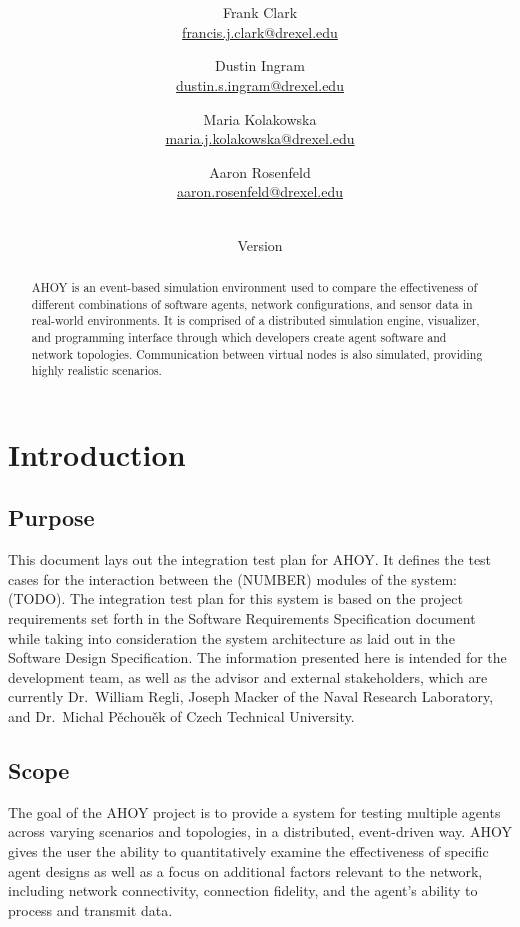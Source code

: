 \documentclass[titlepage]{article}
\title{\textbf{\mytitle}}
\author{
	Frank Clark \\\url{francis.j.clark@drexel.edu}
    \and Dustin Ingram \\\url{dustin.s.ingram@drexel.edu}
	\and Maria Kolakowska \\\url{maria.j.kolakowska@drexel.edu}
    \and Aaron Rosenfeld \\\url{aaron.rosenfeld@drexel.edu}
}
\date{\mydate\\Version \myversion}
\begin{document}

\begin{figure*}
    \centering
    \scalebox{0.8}{}
    \vspace{-4em}
\end{figure*}

\maketitle

\begin{abstract}
AHOY is an event-based simulation environment used to compare the effectiveness of different combinations of software agents, network configurations, and sensor data in real-world environments.  It is comprised of a distributed simulation engine, visualizer, and programming interface through which developers create agent software and network topologies.  Communication between virtual nodes is also simulated, providing highly realistic scenarios.
\end{abstract}

\setcounter{tocdepth}{4}
\tableofcontents
\label{toc}
\pagebreak
{}

\section{Introduction}
\label{sec:introduction}
\subsection{Purpose}
\label{sec:purpose}
This document lays out the integration test plan for AHOY. It defines the test cases for the interaction between the (NUMBER) modules of the system: (TODO). The integration test plan for this system is based on the project requirements set forth in the Software Requirements Specification document while taking into consideration the system architecture as laid out in the Software Design Specification. The information presented here is intended for the development team, as well as the advisor and external stakeholders, which are currently Dr.~William Regli, Joseph Macker of the Naval Research Laboratory, and Dr.~Michal P\v{e}chou\v{e}k of Czech Technical University. 

\subsection{Scope}
The goal of the AHOY project is to provide a system for testing multiple agents across varying scenarios and topologies, in a distributed, event-driven way. AHOY gives the user the ability to quantitatively examine the effectiveness of specific agent designs as well as a focus on additional factors relevant to the network, including network connectivity, connection fidelity, and the agent's ability to process and transmit data.
\end{document}
